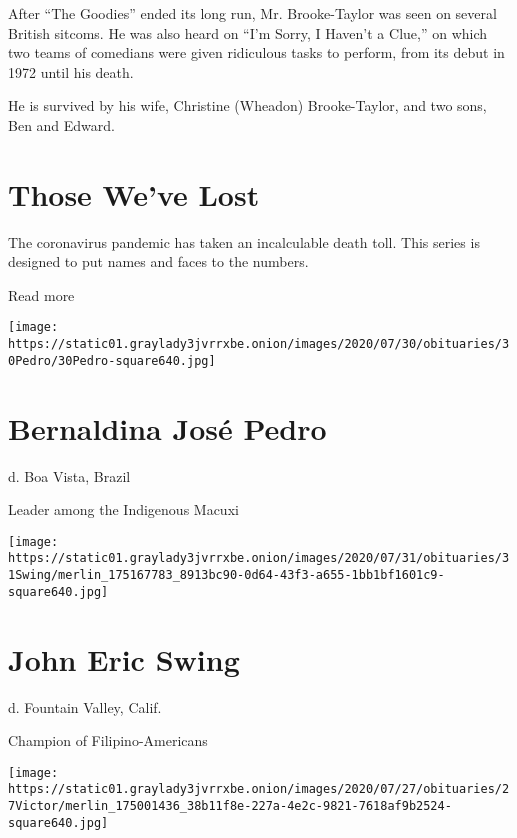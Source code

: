 After ``The Goodies'' ended its long run, Mr. Brooke-Taylor was seen on
several British sitcoms. He was also heard on ``I'm Sorry, I Haven't a
Clue,'' on which two teams of comedians were given ridiculous tasks to
perform, from its debut in 1972 until his death.

He is survived by his wife, Christine (Wheadon) Brooke-Taylor, and two
sons, Ben and Edward.

\href{https://www.nytimes3xbfgragh.onion/interactive/2020/obituaries/people-died-coronavirus-obituaries.html?action=click\&pgtype=Article\&state=default\&region=BELOW_MAIN_CONTENT\&context=covid_obits_promo}{}

\hypertarget{those-weve-lost}{%
\section{Those We've Lost}\label{those-weve-lost}}

The coronavirus pandemic has taken an incalculable death toll. This
series is designed to put names and faces to the numbers.

Read more

\texttt{[image: https://static01.graylady3jvrrxbe.onion/images/2020/07/30/obituaries/30Pedro/30Pedro-square640.jpg]}

\hypertarget{bernaldina-josuxe9-pedro}{%
\section{Bernaldina José Pedro}\label{bernaldina-josuxe9-pedro}}

d. Boa Vista, Brazil

Leader among the Indigenous Macuxi

\texttt{[image: https://static01.graylady3jvrrxbe.onion/images/2020/07/31/obituaries/31Swing/merlin\_175167783\_8913bc90-0d64-43f3-a655-1bb1bf1601c9-square640.jpg]}

\hypertarget{john-eric-swing}{%
\section{John Eric Swing}\label{john-eric-swing}}

d. Fountain Valley, Calif.

Champion of Filipino-Americans

\texttt{[image: https://static01.graylady3jvrrxbe.onion/images/2020/07/27/obituaries/27Victor/merlin\_175001436\_38b11f8e-227a-4e2c-9821-7618af9b2524-square640.jpg]}

